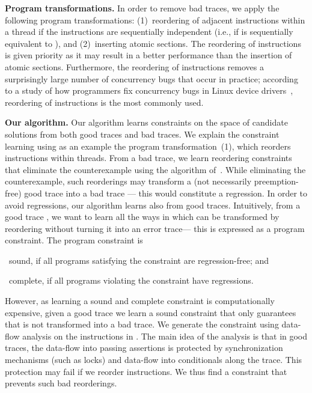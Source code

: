 \documentclass{llncs}
\begin{document}
\noindent
{\bf Program transformations.}
In order to remove bad traces, we apply the following program
transformations: (1)~reordering of adjacent instructions  within 
a thread if the instructions are sequentially independent (i.e., if 
 is sequentially equivalent to ), and (2)~inserting
atomic sections. 
The reordering of instructions is given priority as it may result in a 
better performance than the insertion of atomic sections. Furthermore, 
the reordering of instructions removes a surprisingly large number of
concurrency bugs that occur in practice; according to a study of how
programmers fix concurrency bugs in Linux device drivers~\cite{cav2013},
reordering of instructions is the most commonly used.  


\noindent
{\bf Our algorithm.}
Our algorithm learns constraints on the space of candidate solutions
from both good traces and bad traces.
We explain the constraint learning using as an example the program 
transformation~(1), which reorders instructions within threads. 
From a bad trace, we learn reordering constraints that eliminate 
the counterexample using the algorithm of~\cite{cav2013}.  
While eliminating the counterexample, such reorderings may transform a
(not necessarily preemption-free) good trace 
into a bad trace
--- this would constitute a regression.
In order to avoid regressions, our algorithm learns also from 
good traces. 
Intuitively, from a good trace , we want to learn all the ways 
in which  can be transformed by reordering without turning it into
an error trace--- this is expressed as a program constraint.
The program constraint is
\begin{inparaenum}[(a)]
\item~sound, if all programs satisfying the constraint are
  regression-free; and
\item~complete, if all programs violating the constraint have
  regressions.
\end{inparaenum}
However, as learning a sound and complete constraint is
computationally expensive, given a good trace  we learn a sound
constraint that only guarantees that  is not transformed into a
bad trace. We generate the constraint using data-flow analysis
on the instructions in . The main idea of the 
analysis is that in good traces, the data-flow into passing assertions
is protected by synchronization mechanisms (such as locks) and data-flow
into conditionals along the trace. 
This protection may fail if we reorder instructions. We thus find
a constraint that prevents such bad reorderings. 
 
\end{document}
